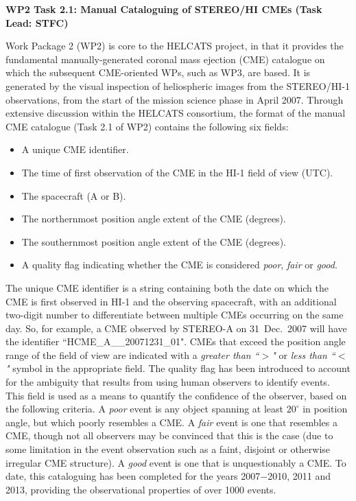 \documentclass[11pt]{report}
\begin{document}
\textbf{WP2 Task 2.1: Manual Cataloguing of STEREO/HI CMEs (Task Lead: STFC)}
\begin{justify}
Work Package 2 (WP2) is core to the HELCATS project, in that it provides the fundamental 
manually-generated coronal mass ejection (CME) catalogue on which the 
subsequent CME-oriented WPs, such as WP3, are based. It is generated by the visual inspection of heliospheric images from the STEREO/HI-1 
observations, from the start of the mission science phase in April 2007. Through extensive discussion 
within the HELCATS consortium, the format of the manual CME catalogue (Task 2.1 of WP2) contains the following six fields:

\begin{itemize}
\item A unique CME identifier.
\item The time of first observation of the CME in the HI-1 field of view (UTC).
\item The spacecraft (A or B).
\item The northernmost position angle extent of the CME (degrees).
\item The southernmost position angle extent of the CME (degrees).
\item A quality flag indicating whether the CME is considered \emph{poor}, \emph{fair} 
or \emph{good}.
\end{itemize}

\noindent
The unique CME identifier is a string containing both the date on which the CME is first observed
in HI-1 and the observing spacecraft, with an additional two-digit number to 
differentiate between multiple CMEs occurring on the same day. So, for example, a CME observed by STEREO-A on 31~Dec.~2007 will have the identifier ``HCME\_A\_\_20071231\_01".  CMEs that exceed the position 
angle range of the field of view are indicated with a \emph{greater than ``$>$"} or \emph{less than ``$<$"} 
symbol in the appropriate field. The quality flag has been introduced to account for the 
ambiguity that results from using human observers to identify events. This field is used as a 
means to quantify the confidence of the observer, based on the following criteria. A 
\emph{poor} event is any object spanning at least $20^\circ$ in position angle, but which 
poorly resembles a CME. A \emph{fair} event is one that resembles a CME, though not all 
observers may be convinced that this is the case (due to some limitation in the event observation such as a faint, disjoint or otherwise irregular CME structure). A \emph{good} event is one that is 
unquestionably a CME. To date, this cataloguing has been completed for the years 2007$-$2010, 2011 and 2013,  providing the observational properties of over 1000 events.
\end{justify}
\vspace*{4mm}
\end{document}

